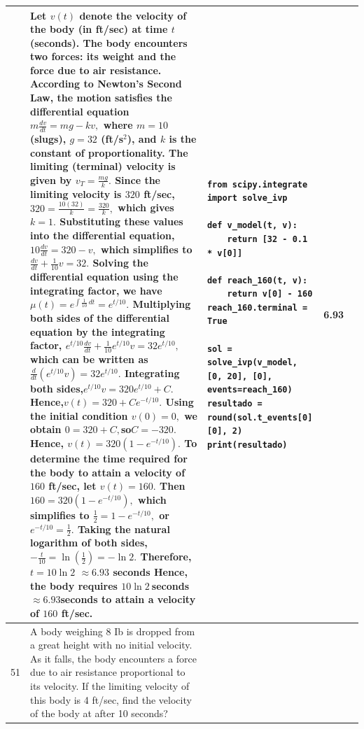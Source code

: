 \documentclass[a4paper,12pt]{article}
\begin{document}
\begin{longtable}{|p{0.3cm}|p{}|p{10cm}|p{}|p{1.5cm}|}
              &Let $v(t)$ denote the velocity of the body (in ft/sec) at time $t$ (seconds).
The body encounters two forces: its weight and the force due to air resistance. According to Newton's Second Law, the motion satisfies the differential equation $m\frac{dv}{dt}=mg-kv,$
where $m=10$ (slugs), $g=32$ (ft/s$^2$), and $k$ is the constant of proportionality.
The limiting (terminal) velocity is given by
$v_T=\frac{mg}{k}.$
Since the limiting velocity is $320$ ft/sec,
$320=\frac{10(32)}{k}=\frac{320}{k},$
which gives $k=1.$
Substituting these values into the differential equation, $10\frac{dv}{dt}=320-v,$
which simplifies to $\frac{dv}{dt}+\frac{1}{10}v=32.$
Solving the differential equation using the integrating factor, we have
$\mu(t)=e^{\int\frac{1}{10}\,dt}=e^{t/10}.$
Multiplying both sides of the differential equation by the integrating factor,
$e^{t/10}\frac{dv}{dt}+\frac{1}{10}e^{t/10}v=32e^{t/10},$
which can be written as
$\frac{d}{dt}\left(e^{t/10}v\right)=32e^{t/10}.$
Integrating both sides,$e^{t/10}v=320e^{t/10}+C.$
Hence,$v(t)=320+Ce^{-t/10}.$
Using the initial condition
$v(0)=0,$ we obtain $0=320+C,$so$C=-320.$
Hence, $v(t)=320\left(1-e^{-t/10}\right).$
To determine the time required for the body to attain a velocity of $160$ ft/sec, let $v(t)=160.$
Then $160=320\left(1-e^{-t/10}\right),$
which simplifies to
$\frac{1}{2}=1-e^{-t/10},$
or $e^{-t/10}=\frac{1}{2}.$
Taking the natural logarithm of both sides,
$-\frac{t}{10}=\ln\left(\frac{1}{2}\right)=-\ln 2.$
Therefore, $t=10\ln 2 $ $\approx 6.93$ seconds
Hence, the body requires $10\ln 2\ $seconds $\approx 6.93$seconds  to attain a velocity of $160$ ft/sec.

 &\begin{verbatim}
from scipy.integrate import solve_ivp

def v_model(t, v):
    return [32 - 0.1 * v[0]]

def reach_160(t, v):
    return v[0] - 160
reach_160.terminal = True

sol = solve_ivp(v_model, [0, 20], [0], events=reach_160)
resultado = round(sol.t_events[0][0], 2)
print(resultado)
\end{verbatim}& 6.93 \\ \hline 
 
 51          & A body weighing 8 Ib is dropped from a great height with no initial velocity. As it falls, the body encounters a force due to air resistance proportional to its velocity. If the limiting velocity of this body is 4 ft/sec, find the velocity of the body at after 10 seconds?



\end{longtable}
\end{document}

